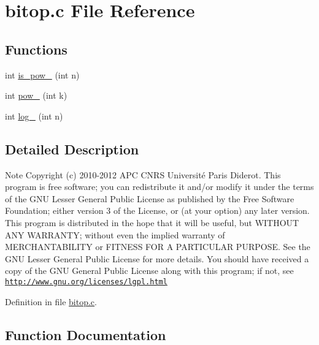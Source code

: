 \section{bitop.\-c File Reference}
\label{bitop_8c}
\subsection*{Functions}
\begin{DoxyCompactItemize}
\item 
int \hyperlink{bitop_8c_a0713ef440514e81791d55128343959ff}{is\-\_\-pow\-\_} (int n)
\item 
int \hyperlink{bitop_8c_a7dca42c78d4069f6fe63cdcd41700916}{pow\-\_} (int k)
\item 
int \hyperlink{bitop_8c_ad0f0d6f1ceedfc8bdd3e76e7f8160abe}{log\-\_} (int n)
\end{DoxyCompactItemize}


\subsection{Detailed Description}
\begin{DoxyNote}{Note}
Copyright (c) 2010-\/2012 A\-P\-C C\-N\-R\-S Université Paris Diderot. This program is free software; you can redistribute it and/or modify it under the terms of the G\-N\-U Lesser General Public License as published by the Free Software Foundation; either version 3 of the License, or (at your option) any later version. This program is distributed in the hope that it will be useful, but W\-I\-T\-H\-O\-U\-T A\-N\-Y W\-A\-R\-R\-A\-N\-T\-Y; without even the implied warranty of M\-E\-R\-C\-H\-A\-N\-T\-A\-B\-I\-L\-I\-T\-Y or F\-I\-T\-N\-E\-S\-S F\-O\-R A P\-A\-R\-T\-I\-C\-U\-L\-A\-R P\-U\-R\-P\-O\-S\-E. See the G\-N\-U Lesser General Public License for more details. You should have received a copy of the G\-N\-U General Public License along with this program; if not, see \href{http://www.gnu.org/licenses/lgpl.html}{\tt http\-://www.\-gnu.\-org/licenses/lgpl.\-html} 
\end{DoxyNote}


Definition in file \hyperlink{bitop_8c_source}{bitop.\-c}.



\subsection{Function Documentation}
